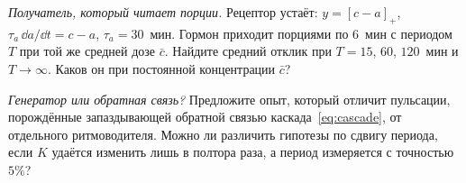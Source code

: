 \begin{exercise}[\lvlB]
\label{ex:16:6}
\emph{Получатель, который читает порции.} Рецептор устаёт: $y=[c-a]_+$, $\tau_a\,\dd a/\dd t=c-a$, $\tau_a=30$~мин. Гормон приходит порциями по $6$~мин с периодом $T$ при той же средней дозе $\bar c$. Найдите средний отклик при $T=15$, $60$, $120$~мин и $T\to\infty$. Каков он при постоянной концентрации $\bar c$?
\end{exercise}

\begin{exercise}[\lvlC]
\label{ex:16:7}
\emph{Генератор или обратная связь?} Предложите опыт, который отличит пульсации, порождённые запаздывающей обратной связью каскада~\eqref{eq:cascade}, от отдельного ритмоводителя. Можно ли различить гипотезы по сдвигу периода, если $K$ удаётся изменить лишь в полтора раза, а период измеряется с точностью $5\%$?
\end{exercise}
